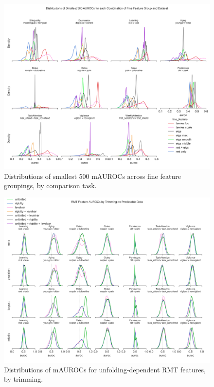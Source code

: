 \documentclass{article}  %
\begin{document}
\begin{spacing}{1}
\begin{figure}
\begin{center}
\includegraphics[width=\textwidth,height=0.9\textheight,keepaspectratio]{fine_feature_smallest_by_subgroup.png}
\end{center}
\caption
{ \label{fig:fine-smallest}
Distributions of smallest 500 mAUROCs across fine feature groupings, by comparison task.}
\end{figure}

\begin{figure}
\begin{center}
\includegraphics[width=\textwidth,height=0.9\textheight,keepaspectratio]{rmt_feature_auroc_by_trim.png}
\end{center}
\caption
{ \label{fig:fine-trim}
Distributions of mAUROCs for unfolding-dependent RMT features, by trimming.}
\end{figure}



\end{spacing}
\end{document}
